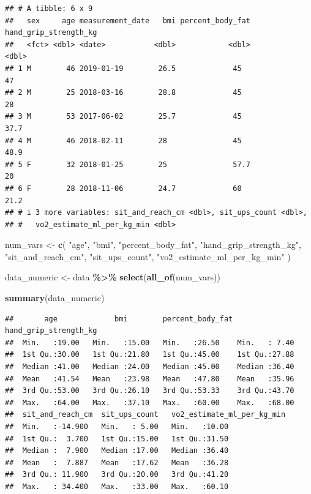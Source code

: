 \documentclass[
]{article}
\newenvironment{Shaded}{\begin{snugshade}}{\end{snugshade}}
\newcommand{\FunctionTok}[1]{\textcolor[rgb]{0.13,0.29,0.53}{\textbf{#1}}}
\newcommand{\NormalTok}[1]{#1}
\newcommand{\OtherTok}[1]{\textcolor[rgb]{0.56,0.35,0.01}{#1}}
\newcommand{\SpecialCharTok}[1]{\textcolor[rgb]{0.81,0.36,0.00}{\textbf{#1}}}
\newcommand{\StringTok}[1]{\textcolor[rgb]{0.31,0.60,0.02}{#1}}
\begin{document}
\begin{verbatim}
## # A tibble: 6 x 9
##   sex     age measurement_date   bmi percent_body_fat hand_grip_strength_kg
##   <fct> <dbl> <date>           <dbl>            <dbl>                 <dbl>
## 1 M        46 2019-01-19        26.5             45                    47  
## 2 M        25 2018-03-16        28.8             45                    28  
## 3 M        53 2017-06-02        25.7             45                    37.7
## 4 M        46 2018-02-11        28               45                    48.9
## 5 F        32 2018-01-25        25               57.7                  20  
## 6 F        28 2018-11-06        24.7             60                    21.2
## # i 3 more variables: sit_and_reach_cm <dbl>, sit_ups_count <dbl>,
## #   vo2_estimate_ml_per_kg_min <dbl>
\end{verbatim}

\begin{Shaded}
\begin{Highlighting}[]
\NormalTok{num\_vars }\OtherTok{\textless{}{-}} \FunctionTok{c}\NormalTok{(}
  \StringTok{"age"}\NormalTok{,}
  \StringTok{"bmi"}\NormalTok{,}
  \StringTok{"percent\_body\_fat"}\NormalTok{,}
  \StringTok{"hand\_grip\_strength\_kg"}\NormalTok{,}
  \StringTok{"sit\_and\_reach\_cm"}\NormalTok{,}
  \StringTok{"sit\_ups\_count"}\NormalTok{,}
  \StringTok{"vo2\_estimate\_ml\_per\_kg\_min"}
\NormalTok{)}

\NormalTok{data\_numeric }\OtherTok{\textless{}{-}}\NormalTok{ data }\SpecialCharTok{\%\textgreater{}\%} \FunctionTok{select}\NormalTok{(}\FunctionTok{all\_of}\NormalTok{(num\_vars))}

\FunctionTok{summary}\NormalTok{(data\_numeric)}
\end{Highlighting}
\end{Shaded}

\begin{verbatim}
##       age             bmi        percent_body_fat hand_grip_strength_kg
##  Min.   :19.00   Min.   :15.00   Min.   :26.50    Min.   : 7.40        
##  1st Qu.:30.00   1st Qu.:21.80   1st Qu.:45.00    1st Qu.:27.88        
##  Median :41.00   Median :24.00   Median :45.00    Median :36.40        
##  Mean   :41.54   Mean   :23.98   Mean   :47.80    Mean   :35.96        
##  3rd Qu.:53.00   3rd Qu.:26.10   3rd Qu.:53.33    3rd Qu.:43.70        
##  Max.   :64.00   Max.   :37.10   Max.   :60.00    Max.   :68.00        
##  sit_and_reach_cm  sit_ups_count   vo2_estimate_ml_per_kg_min
##  Min.   :-14.900   Min.   : 5.00   Min.   :10.00             
##  1st Qu.:  3.700   1st Qu.:15.00   1st Qu.:31.50             
##  Median :  7.900   Median :17.00   Median :36.40             
##  Mean   :  7.887   Mean   :17.62   Mean   :36.28             
##  3rd Qu.: 11.900   3rd Qu.:20.00   3rd Qu.:41.20             
##  Max.   : 34.400   Max.   :33.00   Max.   :60.10
\end{verbatim}
\end{document}
